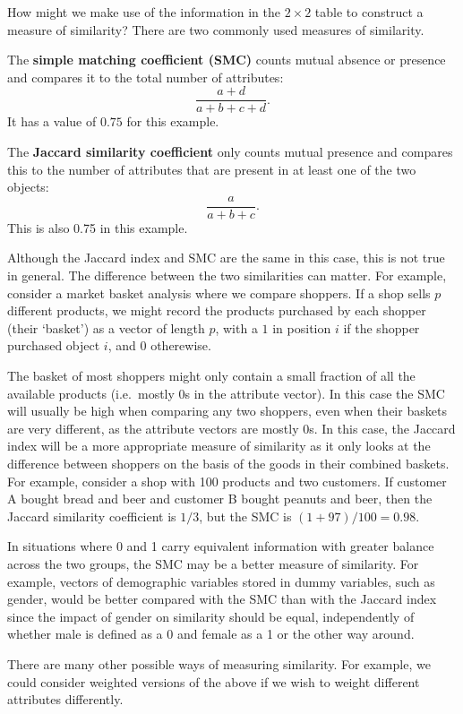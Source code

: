 \documentclass[
]{book}
\theoremstyle{definition}
\theoremstyle{definition}
\theoremstyle{definition}
\theoremstyle{definition}
\theoremstyle{remark}
\begin{document}
How might we make use of the information in the \(2 \times 2\) table to construct a measure of similarity? There are two commonly used measures of similarity.

The \textbf{simple matching coefficient (SMC)} counts mutual absence or presence and compares it to the total number of attributes:
\begin{equation}
\frac{a+d}{a+b+c+d}.
\label{eq:smc}
\end{equation}
It has a value of \(0.75\) for this example.

The \textbf{Jaccard similarity coefficient} only counts mutual presence and compares this to the number of attributes that are present in at least one of the two objects:
\[
\frac{a}{a+b+c}.
\]
This is also 0.75 in this example.

Although the Jaccard index and SMC are the same in this case, this is not true in general.
The difference between the two similarities can matter. For example, consider a market basket analysis where we compare shoppers. If a shop sells \(p\) different products, we might record the products purchased by each shopper (their `basket') as a vector of length \(p\), with a \(1\) in position \(i\) if the shopper purchased object \(i\), and \(0\) otherewise.

The basket of most shoppers might only contain a small fraction of all the available products (i.e.~mostly 0s in the attribute vector). In this case the SMC will usually be high when comparing any two shoppers, even when their baskets are very different, as the attribute vectors are mostly \(0\)s. In this case, the Jaccard index will be a more appropriate measure of similarity as it only looks at the difference between shoppers on the basis of the goods in their combined baskets. For example, consider a shop with 100 products and two customers.
If customer A bought bread and beer and customer B bought peanuts and beer, then the Jaccard similarity coefficient is \(1/3\), but the SMC is \((1+97)/100=0.98\).

In situations where 0 and 1 carry equivalent information with greater balance across the two groups, the SMC may be a better measure of similarity. For example, vectors of demographic variables stored in dummy variables, such as gender, would be better compared with the SMC than with the Jaccard index since the impact of gender on similarity should be equal, independently of whether male is defined as a 0 and female as a 1 or the other way around.

There are many other possible ways of measuring similarity. For example, we could consider weighted versions of the above if we wish to weight different attributes differently.
\end{document}
